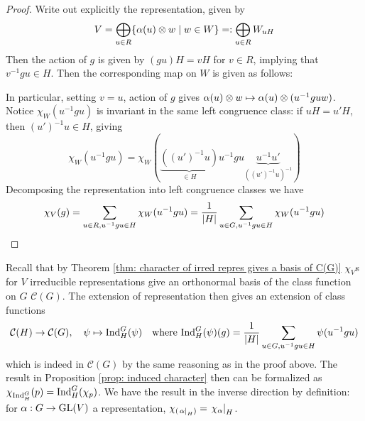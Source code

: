 \begin{proof}
    Write out explicitly the representation, given by
    \[
        V = \bigoplus_{u \in R} \{ \alpha(u) \otimes w \mid w \in W \} =: \bigoplus_{u \in R} W_{uH}
    \]
    Then the action of $g$ is given by $(gu) H = v H$ for $v \in R$, implying that $v^{-1} g u \in H$. Then the corresponding map on $W$ is given as follows:

    \begin{minipage}{\linewidth}
        \centering
    \end{minipage}
    In particular, setting $v = u$, action of $g$ gives $\alpha(u) \otimes w \mapsto \alpha(u) \otimes (u^{-1} gu w)$. Notice $\chi_W (u^{-1} g u)$ is invariant in the same left congruence class: if $uH = u'H$, then $(u')^{-1} u \in H$, giving 
    \[
        \chi_W (u^{-1} g u) = \chi_W (\underbrace{((u')^{-1} u)}_{\in H} u^{-1} g u \underbrace{u^{-1} u'}_{((u')^{-1} u)^{-1}} )
    \]
    Decomposing the representation into left congruence classes we have
    \[
        \chi_V (g) = \sum_{u \in R, u^{-1} g u \in H} \chi_W (u^{-1} g u) = \frac{1}{\left|H\right|} \sum_{u \in G, u^{-1} g u \in H} \chi_W (u^{-1} g u)
    \]
\end{proof}

Recall that by Theorem \ref{thm: character of irred repres gives a basis of C(G)} $\chi_V$s for $V$ irreducible representations give an orthonormal basis of the class function on $G$ $\mathcal{C}(G)$. The extension of representation then gives an extension of class functions
\[
    \mathcal{C}(H) \to \mathcal{C}(G), \quad \psi \mapsto \mathrm{Ind}_H^G (\psi) \quad \text{where } \mathrm{Ind}_H^G (\psi) (g) = \frac{1}{\left|H\right|} \sum_{u \in G, u^{-1} g u \in H} \psi(u^{-1} g u)
\]
which is indeed in $\mathcal{C}(G)$ by the same reasoning as in the proof above. The result in Proposition \ref{prop: induced character} then can be formalized as $\chi_{\mathrm{Ind}_H^G}(p) = \mathrm{Ind}_H^G (\chi_p)$. We have the result in the inverse direction by definition: for $\alpha : G \to \mathrm{GL}(V)$ a representation, $\chi_{(\left.\alpha\right|_{H})} = \left.\chi_{\alpha}\right|_{H}$.

